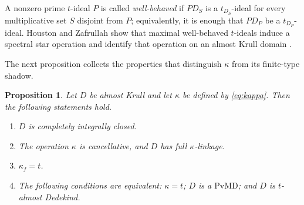 \documentclass[11pt]{amsart}
\newtheorem{proposition}[proposition]{Proposition}
\theoremstyle{definition}
\theoremstyle{remark}
\newcommand{\PvMD}{\mathrm{PvMD}}
\begin{document}
A nonzero prime $t$-ideal $P$ is called \emph{well-behaved} if $PD_S$ is a
$t_{D_S}$-ideal for every multiplicative set $S$ disjoint from $P$;
equivalently, it is enough that $PD_P$ be a $t_{D_P}$-ideal.  Houston and
Zafrullah show that maximal well-behaved $t$-ideals induce a spectral star
operation and identify that operation on an almost Krull domain
\cite[Theorem~2.3 and Corollary~4.8]{HoustonZafrullah}.

The next proposition collects the properties that distinguish $\kappa$ from
its finite-type shadow.

\begin{proposition}\label{prop:kappa}
Let $D$ be almost Krull and let $\kappa$ be defined by \eqref{eq:kappa}.
Then the following statements hold.
\begin{enumerate}[label=\textup{(\roman*)}]
\item $D$ is completely integrally closed.
\item The operation $\kappa$ is cancellative, and $D$ has full
      $\kappa$-linkage.
\item $\kappa_f=t$.
\item The following conditions are equivalent: $\kappa=t$; $D$ is a
      $\PvMD$; and $D$ is $t$-almost Dedekind.
\end{enumerate}
\end{proposition}
\end{document}
